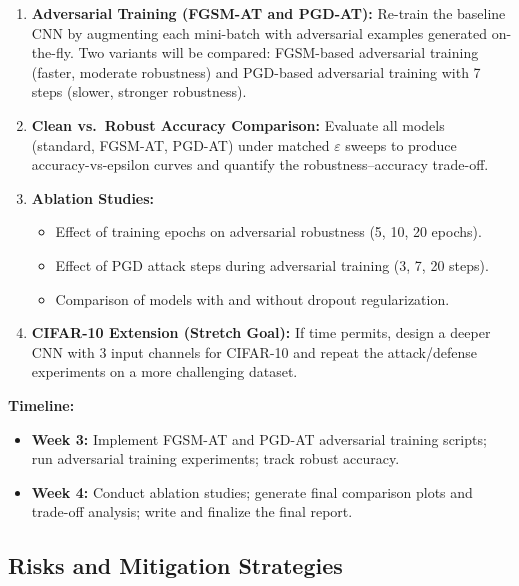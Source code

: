 \documentclass[conference]{IEEEtran}
\begin{document}
\begin{enumerate}
    \item \textbf{Adversarial Training (FGSM-AT and PGD-AT):} Re-train the baseline CNN by augmenting each mini-batch with adversarial examples generated on-the-fly. Two variants will be compared: FGSM-based adversarial training (faster, moderate robustness) and PGD-based adversarial training with 7 steps (slower, stronger robustness).

    \item \textbf{Clean vs.\ Robust Accuracy Comparison:} Evaluate all models (standard, FGSM-AT, PGD-AT) under matched $\varepsilon$ sweeps to produce accuracy-vs-epsilon curves and quantify the robustness--accuracy trade-off.

    \item \textbf{Ablation Studies:}
    \begin{itemize}
        \item Effect of training epochs on adversarial robustness (5, 10, 20 epochs).
        \item Effect of PGD attack steps during adversarial training (3, 7, 20 steps).
        \item Comparison of models with and without dropout regularization.
    \end{itemize}

    \item \textbf{CIFAR-10 Extension (Stretch Goal):} If time permits, design a deeper CNN with 3 input channels for CIFAR-10 and repeat the attack/defense experiments on a more challenging dataset.
\end{enumerate}

\noindent\textbf{Timeline:}
\begin{itemize}
    \item \textbf{Week 3:} Implement FGSM-AT and PGD-AT adversarial training scripts; run adversarial training experiments; track robust accuracy.
    \item \textbf{Week 4:} Conduct ablation studies; generate final comparison plots and trade-off analysis; write and finalize the final report.
\end{itemize}

\subsection{Risks and Mitigation Strategies}
\end{document}
